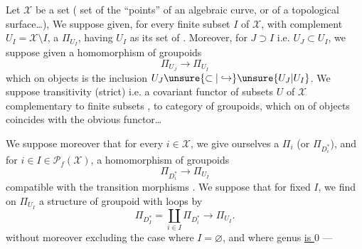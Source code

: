 Let $\mathcal{X}$ be a set \inserted{$\ne\varnothing$}
( set of the
``points'' of an  algebraic curve,
or of a topological surface\ldots), 
 We suppose
given, for every finite subset $I$ of $\mathcal{X}$,
with complement $U_I=\mathcal{X}\setminus I$, a
 $\Pi_{U_I}$, having $U_I$ as its set
of . Moreover, for $J\supset I$ i.e.
$U_J\subset U_I$, we suppose given a homomorphism
of groupoids
\[
\Pi_{U_J}\to\Pi_{U_I}
\]
which on objects is the inclusion $U_J\unsure{\subset|\hookrightarrow}\unsure{U_J|U_I}$.
We suppose transitivity (strict) i.e. 
a covariant functor  of subsets $U$ of
$\mathcal{X}$ complementary to finite subsets , to
 category of groupoids, which on 
of objects coincides with the obvious functor\ldots


We suppose moreover that for every 
$i\in\mathcal{X}$, we give ourselves a 
$\Pi_i$ (or $\Pi_{D_i^*}$),
and  for $i\in I\in\mathcal{P}_f(\mathcal{X})$,
a homomorphism of groupoids
\[
\Pi_{D_i^*}\to\Pi_{U_I}
\]
compatible with the transition morphisms
.
We suppose that for fixed $I$, we find
on $\Pi_{U_I}$ a structure of groupoid
with loops by
\[
\Pi_{D_I^*}=\coprod_{i\in I}\Pi_{D_i^*}\to\Pi_{U_I}.
\]
without moreover excluding the case where $I=\varnothing$, and where   genus \uline{is $0$} --- 

